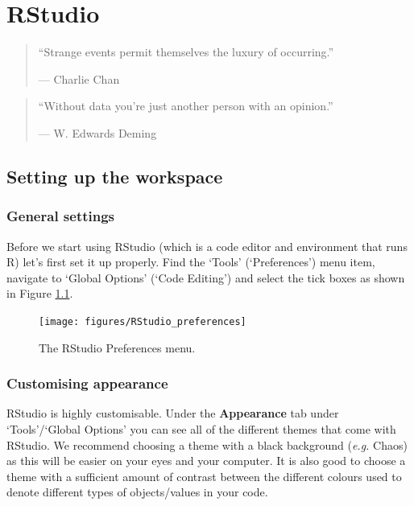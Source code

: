 \documentclass[
]{book}
\begin{document}
\hypertarget{rstudio}{%
\chapter{RStudio}\label{rstudio}}

\begin{quote}
``Strange events permit themselves the luxury of occurring.''

--- Charlie Chan
\end{quote}

\begin{quote}
``Without data you're just another person with an opinion.''

--- W. Edwards Deming
\end{quote}

\hypertarget{setting-up-the-workspace}{%
\section{Setting up the workspace}\label{setting-up-the-workspace}}

\hypertarget{general-settings}{%
\subsection{General settings}\label{general-settings}}

Before we start using RStudio (which is a code editor and environment that runs R) let's first set it up properly. Find the `Tools' (`Preferences') menu item, navigate to `Global Options' (`Code Editing') and select the tick boxes as shown in Figure \ref{fig:RStudio-prefs}.

\begin{figure}

{\centering \texttt{[image: figures/RStudio\_preferences]} 

}

\caption{The RStudio Preferences menu.}\label{fig:RStudio-prefs}
\end{figure}

\hypertarget{customising-appearance}{%
\subsection{Customising appearance}\label{customising-appearance}}

RStudio is highly customisable. Under the \textbf{Appearance} tab under `Tools'/`Global Options' you can see all of the different themes that come with RStudio. We recommend choosing a theme with a black background (\emph{e.g.} Chaos) as this will be easier on your eyes and your computer. It is also good to choose a theme with a sufficient amount of contrast between the different colours used to denote different types of objects/values in your code.
\end{document}
